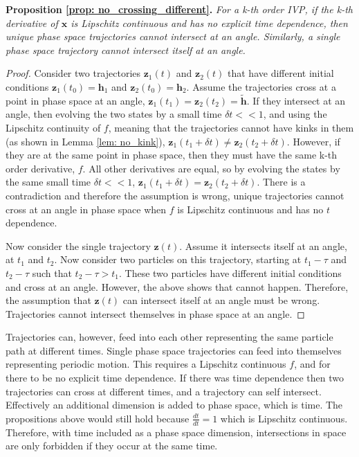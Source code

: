 \documentclass{article}
\theoremstyle{remark}
\theoremstyle{definition}
\begin{document}
\textbf{Proposition \ref{prop: no_crossing_different}.} \textit{For a k-th order IVP, if the k-th derivative of $\mathbf{x}$ is Lipschitz continuous and has no explicit time dependence, then unique phase space trajectories cannot intersect at an angle. Similarly, a single phase space trajectory cannot intersect itself at an angle.}



\begin{proof}
Consider two trajectories $\mathbf{z}_{1}(t)$ and $\mathbf{z}_2(t)$ that have different initial conditions $\mathbf{z}_{1}(t_{0}) = \mathbf{h}_1$ and $\mathbf{z}_{2}(t_{0}) = \mathbf{h}_2$. Assume the trajectories cross at a point in phase space at an angle, $\mathbf{z}_1(t_{1}) = \mathbf{z}_{2}(t_{2}) = \mathbf{\tilde{h}}$. If they intersect at an angle, then evolving the two states by a small time $\delta t << 1$, and using the Lipschitz continuity of $f$, meaning that the trajectories cannot have kinks in them (as shown in Lemma \ref{lem: no_kink}), $\mathbf{z}_{1}(t_{1}+\delta t) \neq \mathbf{z}_{2}(t_{2}+\delta t)$. However, if they are at the same point in phase space, then they must have the same k-th order derivative, $f$. All other derivatives are equal, so by evolving the states by the same small time $\delta t << 1$, $\mathbf{z}_{1}(t_{1}+\delta t) = \mathbf{z}_{2}(t_{2}+\delta t)$. There is a contradiction  and therefore the assumption is wrong, unique trajectories cannot cross at an angle in phase space when $f$ is Lipschitz continuous and has no $t$ dependence.

Now consider the single trajectory $\mathbf{z}(t)$. Assume it intersects itself at an angle, at $t_{1}$ and $t_{2}$. Now consider two particles on this trajectory, starting at $t_{1}-\tau$ and $t_{2}-\tau$ such that $t_{2}-\tau > t_{1}$. These two particles have different initial conditions and cross at an angle. However, the above shows that cannot happen. Therefore, the assumption that $\mathbf{z}(t)$ can intersect itself at an angle must be wrong. Trajectories cannot intersect themselves in phase space at an angle.
\end{proof}


Trajectories can, however, feed into each other representing the same particle path at different times. Single phase space trajectories can feed into themselves representing periodic motion. This requires a Lipschitz continuous $f$, and for there to be no explicit time dependence. If there was time dependence then two trajectories can cross at different times, and a trajectory can self intersect. Effectively an additional dimension is added to phase space, which is time. The propositions above would still hold because $\displaystyle  \frac{dt}{dt} = 1$ which is Lipschitz continuous. Therefore, with time included as a phase space dimension, intersections in space are only forbidden if they occur at the same time.
\end{document}
